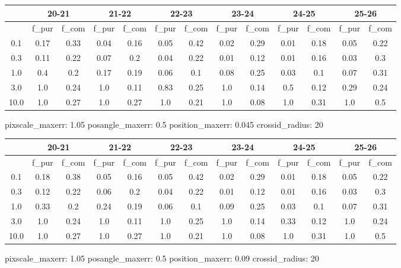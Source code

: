 \documentclass{article}
\begin{document}
\begin{figure}[H]
\centering
\begin{tabular}{|c|c|c|c|c|c|c|c|c|c|c|c|c|}
\hline
\multicolumn{1}{|c|}{} & \multicolumn{2}{|c|}{20-21} & \multicolumn{2}{|c|}{21-22} & \multicolumn{2}{|c|}{22-23} & \multicolumn{2}{|c|}{23-24} & \multicolumn{2}{|c|}{24-25} & \multicolumn{2}{|c|}{25-26}\\
\hline \hline
 & f\_pur & f\_com & f\_pur & f\_com & f\_pur & f\_com & f\_pur & f\_com & f\_pur & f\_com & f\_pur & f\_com \\
\hline
0.1 & 0.17 & 0.33 & 0.04 & 0.16 & 0.05 & 0.42 & 0.02 & 0.29 & 0.01 & 0.18 & 0.05 & 0.22\\
\hline
0.3 & 0.11 & 0.22 & 0.07 & 0.2 & 0.04 & 0.22 & 0.01 & 0.12 & 0.01 & 0.16 & 0.03 & 0.3\\
\hline
1.0 & 0.4 & 0.2 & 0.17 & 0.19 & 0.06 & 0.1 & 0.08 & 0.25 & 0.03 & 0.1 & 0.07 & 0.31\\
\hline
3.0 & 1.0 & 0.24 & 1.0 & 0.11 & 0.83 & 0.25 & 1.0 & 0.14 & 0.5 & 0.12 & 0.29 & 0.24\\
\hline
10.0 & 1.0 & 0.27 & 1.0 & 0.27 & 1.0 & 0.21 & 1.0 & 0.08 & 1.0 & 0.31 & 1.0 & 0.5\\
\hline
\end{tabular}
\caption{pixscale\_maxerr: 1.05 posangle\_maxerr: 0.5 position\_maxerr: 0.045 crossid\_radius: 20}
\end{figure}

\begin{figure}[H]
\centering
\begin{tabular}{|c|c|c|c|c|c|c|c|c|c|c|c|c|}
\hline
\multicolumn{1}{|c|}{} & \multicolumn{2}{|c|}{20-21} & \multicolumn{2}{|c|}{21-22} & \multicolumn{2}{|c|}{22-23} & \multicolumn{2}{|c|}{23-24} & \multicolumn{2}{|c|}{24-25} & \multicolumn{2}{|c|}{25-26}\\
\hline \hline
 & f\_pur & f\_com & f\_pur & f\_com & f\_pur & f\_com & f\_pur & f\_com & f\_pur & f\_com & f\_pur & f\_com \\
\hline
0.1 & 0.18 & 0.38 & 0.05 & 0.16 & 0.05 & 0.42 & 0.02 & 0.29 & 0.01 & 0.18 & 0.05 & 0.22\\
\hline
0.3 & 0.12 & 0.22 & 0.06 & 0.2 & 0.04 & 0.22 & 0.01 & 0.12 & 0.01 & 0.16 & 0.03 & 0.3\\
\hline
1.0 & 0.33 & 0.2 & 0.24 & 0.19 & 0.06 & 0.1 & 0.09 & 0.25 & 0.03 & 0.1 & 0.07 & 0.31\\
\hline
3.0 & 1.0 & 0.24 & 1.0 & 0.11 & 1.0 & 0.25 & 1.0 & 0.14 & 0.33 & 0.12 & 1.0 & 0.24\\
\hline
10.0 & 1.0 & 0.27 & 1.0 & 0.27 & 1.0 & 0.21 & 1.0 & 0.08 & 1.0 & 0.31 & 1.0 & 0.5\\
\hline
\end{tabular}
\caption{pixscale\_maxerr: 1.05 posangle\_maxerr: 0.5 position\_maxerr: 0.09 crossid\_radius: 20}
\end{figure}
\end{document}
